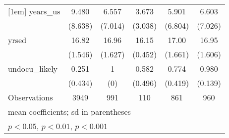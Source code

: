 \begin{table}[htbp]
\begin{tabular}{l*{5}{c}}
[1em]
years\_us            &       9.480         &       6.557         &       3.673         &       5.901         &       6.603         \\
                    &     (8.638)         &     (7.014)         &     (3.038)         &     (6.804)         &     (7.026)         \\
[1em]
yrsed               &       16.82         &       16.96         &       16.15         &       17.00         &       16.95         \\
                    &     (1.546)         &     (1.627)         &     (0.452)         &     (1.661)         &     (1.606)         \\
[1em]
undocu\_likely       &       0.251         &           1         &       0.582         &       0.774         &       0.980         \\
                    &     (0.434)         &         (0)         &     (0.496)         &     (0.419)         &     (0.139)         \\
\hline
Observations        &        3949         &         991         &         110         &         861         &         960         \\
\hline\hline
\multicolumn{6}{l}{\footnotesize mean coefficients; sd in parentheses}\\
\multicolumn{6}{l}{\footnotesize \sym{*} \(p<0.05\), \sym{**} \(p<0.01\), \sym{***} \(p<0.001\)}\\
\end{tabular}
\end{table}
